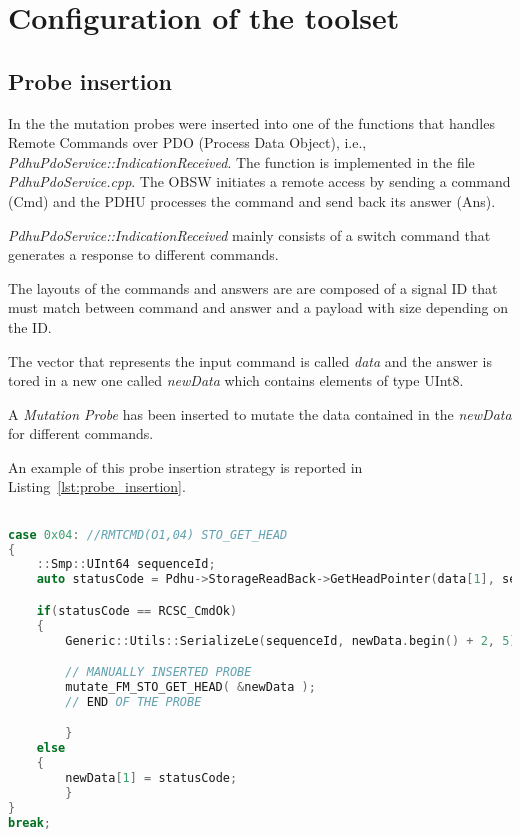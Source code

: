 
\chapter{Configuration of the toolset}

\section{Probe insertion}

In the \case the mutation probes were inserted into one of the functions that handles Remote Commands over PDO (Process Data Object), i.e., \emph{PdhuPdoService::IndicationReceived}. The function is implemented in the file \emph{PdhuPdoService.cpp}.
The OBSW initiates a remote access by sending a command (Cmd) and the PDHU processes the command and send back its answer (Ans).

\emph{PdhuPdoService::IndicationReceived} mainly consists of a switch command that generates a response to different commands.

The layouts of the commands and answers are are composed of a signal ID that must match between command and answer and a payload with size depending on the ID.

The vector that represents the input command is called \emph{data} and the answer is tored in a new one called \emph{newData} which contains elements of type UInt8.


A \emph{Mutation Probe} has been inserted to mutate the data contained in the \emph{newData} for different commands.

An example of this probe insertion strategy is reported in Listing~\ref{lst:probe_insertion}.

\begin{lstlisting}[language=C++, caption=Probe insertion Strategy, label={lst:probe_insertion}]

case 0x04: //RMTCMD(O1,04) STO_GET_HEAD
{
    ::Smp::UInt64 sequenceId;
    auto statusCode = Pdhu->StorageReadBack->GetHeadPointer(data[1], sequenceId);

    if(statusCode == RCSC_CmdOk)
    {
        Generic::Utils::SerializeLe(sequenceId, newData.begin() + 2, 5);

        // MANUALLY INSERTED PROBE
        mutate_FM_STO_GET_HEAD( &newData );
        // END OF THE PROBE

        }
    else
    {
        newData[1] = statusCode;
        }
}
break;

\end{lstlisting}

